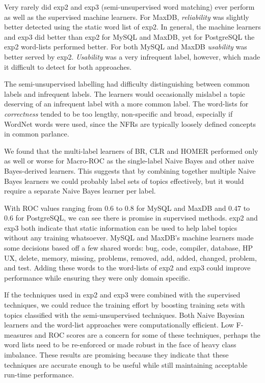 \documentclass[smallextended]{svjour3}       %
\begin{document}
Very rarely did \textsf{exp2} and \textsf{exp3} (semi-unsupervised word matching) ever perform as well as the supervised machine learners. 
For MaxDB, \textit{reliability} was slightly better detected using the static word list of \textsf{exp2}. 
In general, the machine learners and \textsf{exp3} did better than
\textsf{exp2} for MySQL and MaxDB, yet for PostgreSQL the
\textsf{exp2} word-lists performed better.
For both MySQL and MaxDB \textit{usability} was better served by \textsf{exp2}. 
\textit{Usability} was a very infrequent label, however, which made it difficult to detect for both approaches.

The semi-unsupervised labelling had difficulty distinguishing between common labels and infrequent labels. 
The learners would occasionally mislabel a topic deserving of an infrequent label with a more common label.
The word-lists for \emph{correctness} tended to be too lengthy, non-specific and broad, especially if WordNet words were used, since the NFRs are
typically loosely defined concepts in common parlance.

We found that the multi-label learners of BR, CLR and HOMER performed only 
as well or worse for Macro-ROC as the single-label Naive Bayes and other naive Bayes-derived learners. 
This suggests that by combining together multiple Naive Bayes learners
we could probably label sets of topics effectively, but it would
require a separate Naive Bayes learner per label.


With ROC values ranging from $0.6$ to $0.8$ for MySQL and MaxDB and
$0.47$ to $0.6$ for PostgreSQL, we can see there is promise in supervised methods.
\textsf{exp2} and \textsf{exp3} both indicate that static information can be used to help label topics without any training whatsoever. 
MySQL and MaxDB's machine learners made some decisions based off a few shared words: \textsf{bug, code, compiler, database, HP UX, delete, memory,
missing, problems, removed, add, added, changed, problem, and test}. 
Adding these words to the word-lists of \textsf{exp2} and \textsf{exp3} could improve performance while ensuring they were only domain specific.

If the techniques used in \textsf{exp2} and \textsf{exp3} were combined with the supervised techniques, we could reduce the training effort by boosting
training sets with topics classified with the semi-unsupervised techniques.
Both Naive Bayesian learners and the word-list approaches were computationally efficient.  
Low F-measures and ROC scores are a concern for some of these
techniques, perhaps the word lists need to be re-enforced or made
robust in the face of heavy class imbalance.
These results are promising because they indicate that these
techniques are accurate enough to be useful while still maintaining
acceptable run-time performance.
\end{document}
